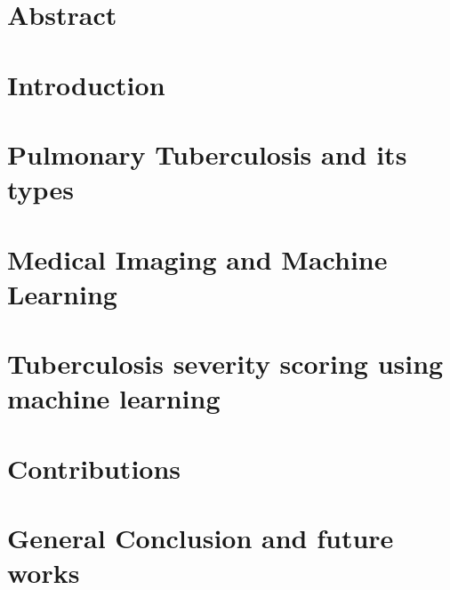 \documentclass[12pt]{report}
\begin{document}
\chapter*{Abstract}


\tableofcontents
\newpage    
\printacronyms[include-classes=abbrev,name=Abbreviations]
\chapter*{Introduction}

\chapter{Pulmonary Tuberculosis and its types}

\chapter{Medical Imaging and Machine Learning}

\chapter{Tuberculosis severity scoring using machine learning}

\chapter{Contributions}

\chapter*{General Conclusion  and future works}


\newpage
\printacronyms[include-classes=abbrev,name=Abbreviations]
\listoffigures
\listoftables
\newpage
 

\end{document}
